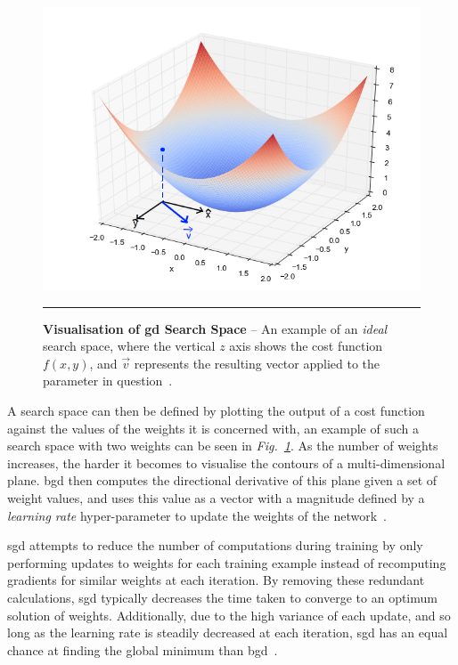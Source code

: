 \begin{figure}[H]
\includegraphics[width=1\textwidth]{media/literature/gd-example.png}
    \rule{35em}{0.5pt}
    \caption[Example visualisation of gradient descent]{\textbf{Visualisation of \gls{gd} Search Space} -- An example of an \textit{ideal} search space, where the vertical $z$ axis shows the cost function $f(x, y)$, and $\vec{v}$ represents the resulting vector applied to the parameter in question~\citep{bendersky2016}.}\label{fig:gd-example}
\end{figure}

A search space can then be defined by plotting the output of a cost function against the values of the weights
it is concerned with, an example of such a search space with two weights can be seen in \textit{Fig.~\ref{fig:gd-example}}.
As the number of weights increases, the harder it becomes to visualise the contours of a multi-dimensional plane. 
\gls{bgd} then computes the directional derivative of this plane given a set of weight values, and uses this value
as a vector with a magnitude defined by a \textit{learning rate} hyper-parameter to update the weights of the network~\citep{ruder2017}.

\gls{sgd} attempts to reduce the number of 
computations during training by only performing updates
to weights for each training example instead of recomputing gradients for similar weights
at each iteration. By removing these redundant calculations, \gls{sgd} typically decreases the time taken
to converge to an optimum solution of weights. Additionally, due to the high variance of
each update, and so long as the learning rate is steadily decreased at each iteration, \gls{sgd} has an equal
chance at finding the global minimum than \gls{bgd}~\citep{ruder2017}.

